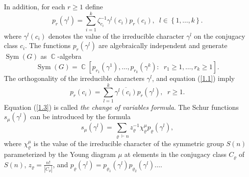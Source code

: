 \documentclass[12pt]{amsart}
\theoremstyle{definition}
\numberwithin{equation}{section}
\DeclareMathOperator{\C}{\mathbb{C}}
\DeclareMathOperator{\Sym}{Sym}
\begin{document}
In addition,  for each $r\geq 1$ define
\begin{equation}\label{1.1}
p_r\left(\gamma^l\right)=\sum\limits_{i=1}^k\zeta^{-1}_{c_i}\gamma^l\left(c_i\right)p_r\left(c_i\right),\;\; l\in\left\{1,\ldots,k\right\}.
\end{equation}
where  $\gamma^l\left(c_i\right)$ denotes the value of the irreducible character $\gamma^l$ on the conjugacy class $c_i$. The functions $p_r\left(\gamma^l\right)$ are algebraically independent and generate $\Sym\left(G\right)$ as $\C$-algebra
$$
\Sym\left(G\right)=\C\left[p_{r_1}(\gamma^1),\ldots,p_{r_k}(\gamma^k):\;\; r_1\geq 1,\ldots, r_k\geq 1\right].
$$
The orthogonality of the irreducible characters $\gamma^l$,  and equation (\ref{1.1}) imply
\begin{equation}\label{1.3}
p_r\left(c_i\right)=\sum\limits_{l=1}^k\overline{\gamma^l\left(c_i\right)}p_r\left(\gamma^l\right),\;\; r\geq 1.
\end{equation}
Equation (\ref{1.3}) is called \textit{the change of variables formula}.
The Schur functions $s_{\mu}\left(\gamma^l\right)$ can be introduced by the formula
\begin{equation}
s_{\mu}\left(\gamma^l\right)=\sum\limits_{\varrho\vdash n}z_{\varrho}^{-1}\chi_{\varrho}^{\mu}p_{\varrho}\left(\gamma^l\right),
\end{equation}
where $\chi_{\varrho}^{\mu}$ is the value of the irreducible character
of the symmetric group $S(n)$ parameterized by the Young diagram $\mu$ at elements in the conjugacy class $C_{\varrho}$ of $S(n)$, $z_{\varrho}=\frac{n!}{\left|C_{\varrho}\right|}$, and $p_{\varrho}\left(\gamma^l\right)=p_{\varrho_1}\left(\gamma^l\right)p_{\varrho_2}\left(\gamma^l\right)\ldots$.
\end{document}
